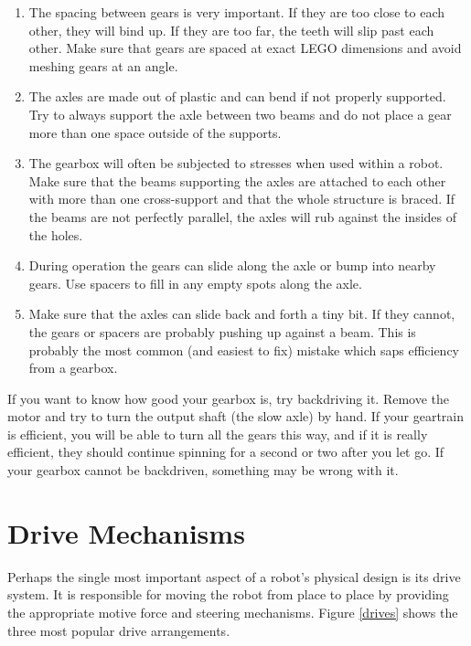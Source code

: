 \begin{enumerate}

\item The spacing between gears is very important. If they are too close to each other, they will bind up. If they are too far, the teeth will slip past each other. Make sure that gears are spaced at exact LEGO dimensions and avoid meshing gears at an angle. 

\item The axles are made out of plastic and can bend if not properly supported. Try to always support the axle between two beams and do not place a gear more than one space outside of the supports.

\item The gearbox will often be subjected to stresses when used within a robot. Make sure that the beams supporting the axles are attached to each other with more than one cross-support and that the whole structure is braced. If the beams are not perfectly parallel, the axles will rub against the insides of the holes. 

\item During operation the gears can slide along the axle or bump into nearby gears. Use spacers to fill in any empty spots along the axle. 

\item Make sure that the axles can slide back and forth a tiny bit. If they cannot, the gears or spacers are probably pushing up against a beam. This is probably the most common (and easiest to fix) mistake which saps efficiency from a gearbox. 

\end{enumerate}

If you want to know how good your gearbox is, try backdriving it. Remove the motor and try to turn the output shaft (the slow axle) by hand. If your geartrain is efficient, you will be able to turn all the gears this way, and if it is really efficient, they should continue spinning for a second or two after you let go. If your gearbox cannot be backdriven, something may be wrong with it.

\section{Drive Mechanisms}

Perhaps the single most important aspect of a robot's physical design is its drive system.  It is responsible for moving the robot from place to place by providing the appropriate motive force and steering mechanisms.  Figure \ref{drives} shows the three most popular drive arrangements.

